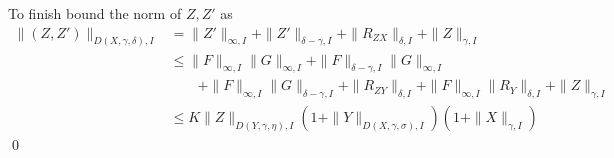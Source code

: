 \documentclass[a4paper,12pt,reqno]{amsproc}
\begin{document}
To finish bound the norm of
$Z,Z'$ as 
\begin{equation*}
  \begin{split}
\|(Z,Z')\|_{D(X,\gamma,\delta),I} & = \|Z'\|_{\infty,I} +
\|Z'\|_{\delta-\gamma,I} + \|R_{ZX}\|_{\delta,I} + \|Z\|_{\gamma,I}   
\\ & \le
 \|F\|_{\infty,I} \|G\|_{\infty,I} +
\|F\|_{\delta-\gamma,I}\|G\|_{\infty,I} 
\\ & \qquad + \|F\|_{\infty,I} \|G\|_{\delta-\gamma,I} 
+ \|R_{ZY}\|_{\delta,I} + \|F\|_{\infty,I} \|R_Y\|_{\delta,I} + \|Z\|_{\gamma,I}   
\\ & \le K \|Z\|_{D(Y,\gamma,\eta),I} (1+
   \|Y\|_{D(X,\gamma,\sigma),I})(1+ \|X\|_{\gamma,I})
  \end{split}
\end{equation*}
\qed
\end{document}
